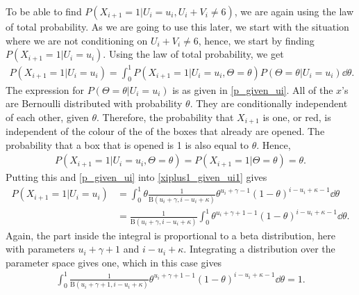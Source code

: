 To be able to find $P(X_{i+1}=1|U_i=u_i,U_i+V_i\neq6)$, we are again using the law of total probability. As we are going to use this later, we start with the situation where we are not conditioning on $U_i+V_i\neq6$, hence, we start by finding $P(X_{i+1}=1|U_i=u_i)$. Using the law of total probability, we get
\begin{equation}
\label{xiplus1_given_ui1}
    \begin{aligned}
        P(X_{i+1}=1|U_i=u_i)
        = \int_0^1 P(X_{i+1}=1|U_i=u_i,\Theta=\theta)P(\Theta=\theta|U_i=u_i) \dd \theta.
    \end{aligned}
\end{equation}
The expression for $P(\Theta=\theta|U_i=u_i)$ is as given in \eqref{p_given_ui}. All of the $x$'s are Bernoulli distributed with probability $\theta$. They are conditionally independent of each other, given $\theta$. Therefore, the probability that $X_{i+1}$ is one, or red, is independent of the colour of the of the boxes that already are opened. The probability that a box that is opened is 1 is also equal to $\theta$. Hence,
\begin{equation*}
    \begin{aligned}
        P(X_{i+1}=1|U_i=u_i,\Theta=\theta) = P(X_{i+1}=1|\Theta=\theta) = \theta.
    \end{aligned}
\end{equation*}
Putting this and \eqref{p_given_ui} into \eqref{xiplus1_given_ui1} gives
\begin{equation}
\label{xiplus1_given_ui2}
    \begin{aligned}
        P(X_{i+1}=1|U_i=u_i)
        &= \int_0^1 \theta \frac{1}{\text{B}(u_i+\gamma,i-u_i+\kappa)}\theta^{u_i+\gamma-1}(1-\theta)^{i-u_i+\kappa-1}  \dd \theta\\[6pt]
        &=\frac{1}{\text{B}(u_i+\gamma,i-u_i+\kappa)} \int_0^1 \theta^{u_i+\gamma+1-1}(1-\theta)^{i-u_i+\kappa-1} \dd \theta.
    \end{aligned}
\end{equation}
Again, the part inside the integral is proportional to a beta distribution, here with parameters $u_i+\gamma+1$ and $i-u_i+\kappa$. Integrating a distribution over the parameter space gives one, which in this case gives
\begin{equation*}
    \begin{aligned}
        \int_0^1 \frac{1}{\text{B}(u_i+\gamma+1,i-u_i+\kappa)} \theta^{u_i+\gamma+1-1}(1-\theta)^{i-u_i+\kappa-1}  \dd \theta = 1.
    \end{aligned}
\end{equation*}
